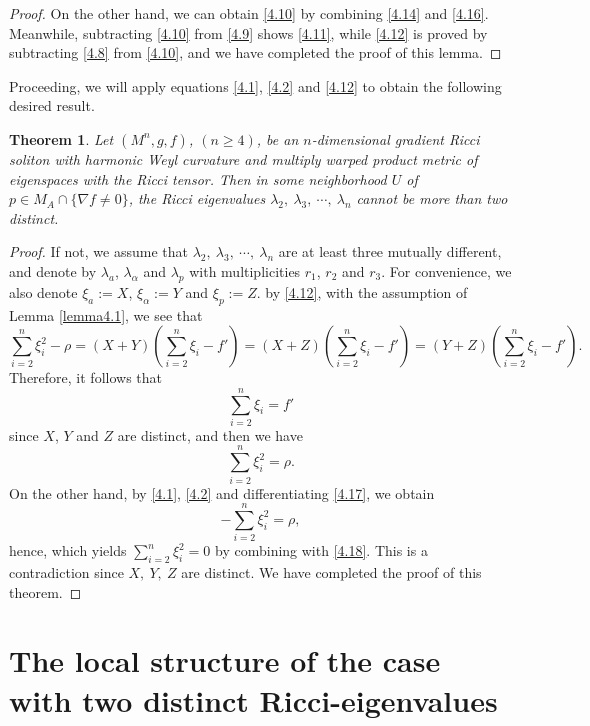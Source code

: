 \documentclass{amsart}
\newtheorem{theorem}{Theorem}[section]
\theoremstyle{definition}
\theoremstyle{remark}
\numberwithin{equation}{section}
\begin{document}
\begin{proof}
On the other hand, we can obtain \eqref{4.10} by combining \eqref{4.14} and \eqref{4.16}.
Meanwhile, subtracting \eqref{4.10} from \eqref{4.9} shows \eqref{4.11}, while \eqref{4.12} is proved by subtracting \eqref{4.8} from \eqref{4.10}, and we have completed the proof of this lemma.
\end{proof}	
	
Proceeding, we will apply equations \eqref{4.1}, \eqref{4.2} and \eqref{4.12} to obtain the following desired result.		
\begin{theorem}\label{thm4.1}
Let $(M^n, g, f)$, $(n\geq 4)$, be an $n$-dimensional gradient Ricci soliton with harmonic Weyl curvature  and multiply warped product metric of eigenspaces with the Ricci tensor.
 Then in some neighborhood $U$ of $p \in M_A \cap \{ \nabla f \neq 0  \}$, the Ricci eigenvalues $\lambda_2,~\lambda_3,~\cdots,~\lambda_n$ cannot be more than two distinct. 
\end{theorem}
	
\begin{proof}
If not, we assume that $\lambda_2,~\lambda_3,~\cdots,~\lambda_n$ are at least three mutually different, and denote by $\lambda_a$, $\lambda_\alpha$ and $\lambda_p$ with multiplicities $r_1$, $r_2$ and $r_3$.
For convenience, we also denote $\xi_a:=X$, $\xi_\alpha:=Y$ and  $\xi_{p}:=Z$. by \eqref{4.12}, with the assumption of Lemma \ref{lemma4.1}, we see that
\[
\sum^n_{i=2}\xi^2_i-\rho=(X+Y)\left( \sum^n_{i=2}\xi_i -f' \right)
=(X+Z)\left( \sum^n_{i=2}\xi_i -f' \right)
=(Y+Z)\left( \sum^n_{i=2}\xi_i -f' \right).
\]
Therefore, it follows that
\begin{equation}\label{4.17}
\sum^n_{i=2}\xi_i =f' 
\end{equation}
since $X$, $Y$ and $Z$ are distinct, and then we have
\begin{equation}\label{4.18}
\sum^n_{i=2}\xi^2_i =\rho.
\end{equation}
 On the other hand, by \eqref{4.1}, \eqref{4.2} and differentiating \eqref{4.17}, we obtain 
\[
-\sum^n_{i=2}\xi^2_i =\rho,
\]
hence, which yields $\sum^n_{i=2}\xi^2_i=0$ by combining with \eqref{4.18}.
This is a contradiction since $X,~Y,~Z$ are distinct.
We have completed the proof of this theorem. 
\end{proof}

	
	
\section{The local structure of the case with two distinct Ricci-eigenvalues}
	
\end{document}
